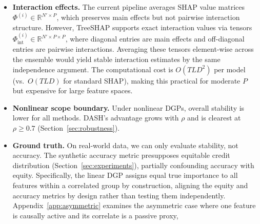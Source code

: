 \documentclass[11pt]{article}
\newcommand{\dash}{\textsc{DASH}}
\newcommand{\rhovar}{\rho}
\begin{document}
\begin{itemize}
    \citep{janzing2020feature, aas2021explaining}, potentially
    producing unintuitive attributions. Averaging across diverse models
    mitigates individual-model artifacts, but the fundamental tension
    between interventional SHAP and correlated features remains.
    More broadly, \dash{} stabilizes \emph{predictive}
    attributions---what the model learned from each feature---not
    \emph{causal} attributions in the interventionist sense
    \citep{janzing2020feature}.  The term ``causally active'' used in
    Appendix~\ref{app:asymmetric} refers to features with non-zero
    coefficients in the data-generating process, not to a formal causal
    framework.  The semantics of interventional SHAP under collinearity
    are themselves disputed \citep{chen2020true, aas2021explaining};
    \dash{} does not resolve this debate but reduces the
    \emph{additional} instability introduced by model-training
    randomness.
  \item \textbf{Interaction effects.} The current pipeline averages SHAP
    value matrices $\Phi^{(i)} \in \mathbb{R}^{N' \times P}$, which
    preserves main effects but not pairwise interaction structure.
    However, TreeSHAP supports exact interaction values via tensors
    $\Phi_{\text{int}}^{(i)} \in \mathbb{R}^{N' \times P \times P}$,
    where diagonal entries are main effects and off-diagonal entries
    are pairwise interactions. Averaging these tensors element-wise
    across the ensemble would yield stable interaction estimates
    by the same independence argument. The computational cost is
    $O(TLD^2)$ per model (vs.\ $O(TLD)$ for standard SHAP), making
    this practical for moderate $P$ but expensive for large feature
    spaces.
  \item \textbf{Nonlinear scope boundary.} Under nonlinear DGPs,
    overall stability is lower for all methods. \dash{}'s advantage
    grows with $\rhovar$ and is clearest at $\rhovar \geq 0.7$
    (Section~\ref{sec:robustness}).
  \item \textbf{Ground truth.} On real-world data, we can only evaluate
    stability, not accuracy. The synthetic accuracy metric presupposes
    equitable credit distribution (Section~\ref{sec:experiments}),
    partially confounding accuracy with equity. Specifically, the
    linear DGP assigns equal true importance to all features within a
    correlated group by construction, aligning the equity and accuracy
    metrics by design rather than testing them independently.
    Appendix~\ref{app:asymmetric} examines the asymmetric case where
    one feature is causally active and its correlate is a passive proxy,

\end{itemize}
\end{document}
